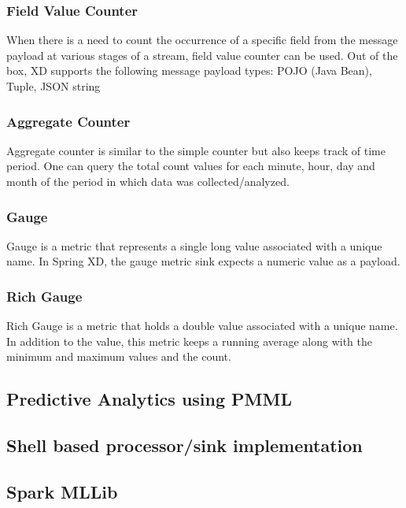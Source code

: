 \subsubsection {Field Value Counter} 

  When there is a need to count the occurrence of a specific field from the message payload at various stages of a stream, field value counter can be used. Out of the box, XD supports the following message payload types:
POJO (Java Bean), Tuple, JSON string

\subsubsection {Aggregate Counter}

   Aggregate counter is similar to the simple counter but also keeps track of time period. One can query the total count values for each minute, hour, day and month of the period in which data was collected/analyzed. 

\subsubsection {Gauge}
  Gauge is a metric that represents a single long value associated with a unique name. In Spring XD, the gauge metric sink expects a numeric value as a payload.

\subsubsection {Rich Gauge}
  Rich Gauge is a metric that holds a double value associated with a unique name. In addition to the value, this metric keeps a running average along with the minimum and maximum values and the count.

\subsection {Predictive Analytics using PMML}

\subsection {Shell based processor/sink implementation}

\subsection{Spark MLLib}

